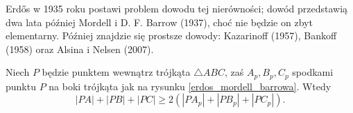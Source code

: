 %

\label{subsection_erdos_mordell}
Erdős w 1935 roku postawi problem dowodu tej nierówności; dowód przedstawią dwa lata później Mordell i D. F. Barrow (1937), choć nie będzie on zbyt elementarny.
Później znajdzie się prostsze dowody: Kazarinoff (1957), Bankoff (1958) oraz Alsina i Nelsen (2007).

\begin{theorem}
    Niech $P$ będzie punktem wewnątrz trójkąta $\triangle ABC$, zaś $A_p, B_p, C_p$ spodkami punktu $P$ na boki trójkąta jak na rysunku \ref{erdos_mordell_barrowa}.
    Wtedy
    \begin{equation}
        |PA| + |PB| + |PC| \ge 2 (|PA_p| + |PB_p| + |PC_p|).
    \end{equation}
\end{theorem}


